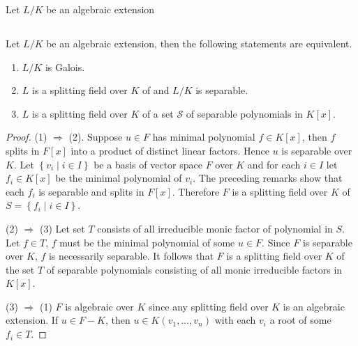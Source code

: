 \begin{definition}
    Let $L/K$ be an algebraic extension
\end{definition}



\subsection{}




\begin{theorem}
    Let $L/K$ be an algebraic extension, then the following statements are equivalent.
    \begin{enumerate}
        \item
              $L/K$ is Galois.

        \item
              $L$ is a splitting field over $K$ of and $L/K$ is separable.

        \item
              $L$ is a splitting field over $K$ of a set $\mathcal{S}$ of separable polynomials in $ K [ x ]$.
    \end{enumerate}
    \begin{proof}
        (1) $\Rightarrow$ (2).
        Suppose $u \in F$ has minimal polynomial $f \in K[x]$, then $f$ splits in $F[x]$ into a product of distinct linear factors. Hence $u$ is separable over $K$.
        Let $\left\{v_i \mid i \in I\right\}$ be a basis of vector space $F$ over $K$ and for each $i \in I$ let $f_i \in K[x]$ be the minimal polynomial of $v_i$. The preceding remarks show that each $f_i$ is separable and splits in $F[x]$. Therefore $F$ is a splitting field over $K$ of $S=\left\{f_i \mid i \in I\right\}$.

        (2) $\Rightarrow$ (3)
        Let set $T$ consists of all irreducible monic factor of polynomial in $S$.
        Let $f \in T$, $f$ must be the minimal polynomial of some $u \in F$.
        Since $F$ is separable over $K$, $f$ is necessarily separable.
        It follows that $F$ is a splitting field over $K$ of the set $T$ of separable polynomials consisting of all monic irreducible factors in $K[x]$.

        (3) $\Rightarrow$ (1) $F$ is algebraic over $K$ since any splitting field over $K$ is an algebraic extension.
        If $u \in F-K$, then $u \in K\left(v_1, \ldots, v_n\right)$ with each $v_i$ a root of some $f_i \in T$.
    \end{proof}
\end{theorem}











